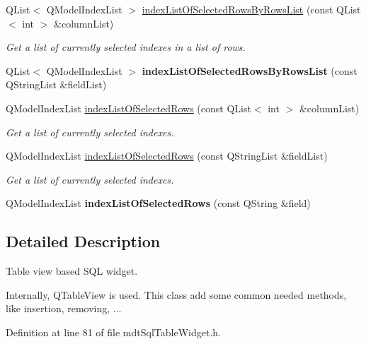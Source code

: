 \begin{DoxyCompactItemize}
\item 
QList$<$ QModelIndexList $>$ \hyperlink{classmdt_sql_table_widget_af28a5a54efb31c29734fb5b2d7f0e2fa}{indexListOfSelectedRowsByRowsList} (const QList$<$ int $>$ \&columnList)
\begin{DoxyCompactList}\small\item\em Get a list of currently selected indexes in a list of rows. \end{DoxyCompactList}\item 
\hypertarget{classmdt_sql_table_widget_a5abe02dacc9fd8c0c33c27dbc5216d1b}{
QList$<$ QModelIndexList $>$ {\bfseries indexListOfSelectedRowsByRowsList} (const QStringList \&fieldList)}
\label{classmdt_sql_table_widget_a5abe02dacc9fd8c0c33c27dbc5216d1b}

\item 
QModelIndexList \hyperlink{classmdt_sql_table_widget_a9a43d9a5d2e63189f17d2bce7159e510}{indexListOfSelectedRows} (const QList$<$ int $>$ \&columnList)
\begin{DoxyCompactList}\small\item\em Get a list of currently selected indexes. \end{DoxyCompactList}\item 
QModelIndexList \hyperlink{classmdt_sql_table_widget_abe241fe0b24552b5403cb15593e18cdd}{indexListOfSelectedRows} (const QStringList \&fieldList)
\begin{DoxyCompactList}\small\item\em Get a list of currently selected indexes. \end{DoxyCompactList}\item 
\hypertarget{classmdt_sql_table_widget_a9616d390c25a3b1e863e855e00172e42}{
QModelIndexList {\bfseries indexListOfSelectedRows} (const QString \&field)}
\label{classmdt_sql_table_widget_a9616d390c25a3b1e863e855e00172e42}

\end{DoxyCompactItemize}


\subsection{Detailed Description}
Table view based SQL widget. 

Internally, QTableView is used. This class add some common needed methods, like insertion, removing, ... 

Definition at line 81 of file mdtSqlTableWidget.h.



